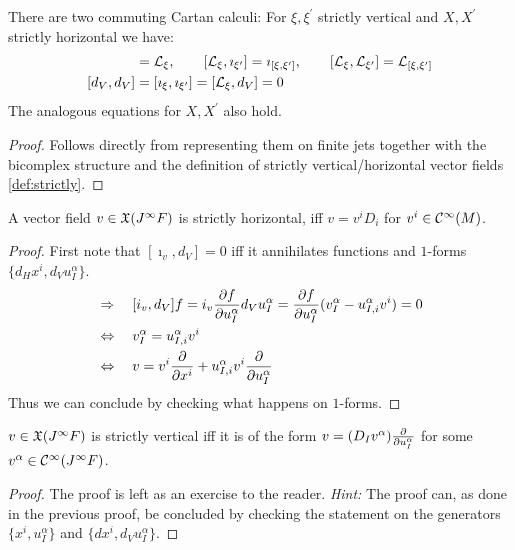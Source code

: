 \begin{prop}
  There are two commuting Cartan calculi: For $\xi, \xi^\prime$ strictly vertical and $X,X^\prime$ strictly horizontal we have:
  \begin{align}
    [\imath_\xi, d_V] &= \lie{\xi}, \quad \quad [\lie{\xi}, \imath_{\xi^\prime}] = \imath_{[\xi, \xi^\prime]}, \quad \quad [\lie{\xi}, \lie{\xi^\prime}] = \lie{[\xi, \xi^\prime]}\\
    [d_V,d_V] &= [\imath_\xi, \imath_{\xi^\prime}] = [\lie{\xi}, d_V] = 0
  \end{align}
  The analogous equations for $X, X^\prime$ also hold.
\begin{proof}
  Follows directly from representing them on finite jets together with the bicomplex structure and the definition of strictly vertical/horizontal vector fields \ref{def:strictly}.
\end{proof}
\end{prop}

\begin{lem}
  A vector field $v\in \mathfrak{X}(J^\infty F)$ is strictly horizontal, iff $v = v^i D_i$ for $v^i \in \mathcal{C}^{\infty}(M)$.
\begin{proof}
  First note that $[\imath_v, d_V] = 0$ iff it annihilates functions and $1$-forms $\{d_H x^i, d_V u^\alpha_I \}$.
  \begin{align}
    &\Rightarrow \quad [i_v, d_V] f = i_v \frac{\partial f}{\partial u^\alpha_I} d_V u^\alpha_I = \frac{\partial f}{\partial u^\alpha_I} (v^\alpha_I - u^\alpha_{I,i} v^i) = 0\\
    &\Leftrightarrow \quad v^\alpha_I = u^\alpha_{I,i} v^i\\
    &\Leftrightarrow \quad v = v^i \frac{\partial }{\partial x^i} + u^\alpha_{I,i} v^i \frac{\partial }{\partial u^\alpha_I}
  \end{align}
  Thus we can conclude by checking what happens on $1$-forms.
\end{proof}
\end{lem}

\begin{lem}
  $v\in \mathfrak{X}(J^\infty F)$ is strictly vertical iff it is of the form $v = (D_I v^\alpha) \frac{\partial }{\partial u^\alpha_I}$ for some $v^\alpha \in \mathcal{C}^{\infty}(J^\infty F)$.
\begin{proof}
  The proof is left as an exercise to the reader. \emph{Hint:} The proof can, as done in the previous proof, be concluded by checking the statement on the generators $\{x^i, u^\alpha_I\}$ and $\{dx^i, d_V u^\alpha_I\}$.
\end{proof}
\end{lem}

